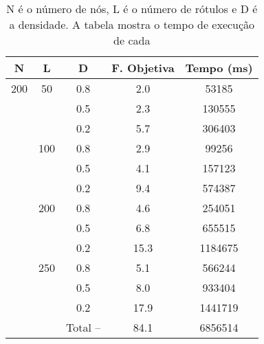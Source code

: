 \documentclass{sig-alternate-05-2015}
\begin{document}
\begin{table}[!h]


\begin{tabular}{ccccc}
	\hline \rule[-2ex]{0pt}{5.5ex} N & L & D  & F. Objetiva & Tempo (ms) \\ 
	\hline \rule[-2ex]{0pt}{5.5ex} 200 & 50 & 0.8 & 2.0 & 53185 \\ 
	\rule[-2ex]{0pt}{5.5ex}  &  & 0.5 & 2.3 & 130555 \\ 
	 \rule[-2ex]{0pt}{5.5ex}  &  & 0.2 & 5.7 & 306403 \\ 
	 \rule[-2ex]{0pt}{5.5ex}  & 100 & 0.8 & 2.9 & 99256 \\ 
	 \rule[-2ex]{0pt}{5.5ex}  &  & 0.5 & 4.1 & 157123 \\ 
	 \rule[-2ex]{0pt}{5.5ex}  &  & 0.2 & 9.4 & 574387 \\ 
	 \rule[-2ex]{0pt}{5.5ex}  & 200 & 0.8 & 4.6 & 254051 \\ 
	 \rule[-2ex]{0pt}{5.5ex}  &  & 0.5 & 6.8 & 655515 \\ 
	 \rule[-2ex]{0pt}{5.5ex}  &  & 0.2 & 15.3 & 1184675 \\ 
	 \rule[-2ex]{0pt}{5.5ex}  & 250 & 0.8 & 5.1 & 566244 \\ 
	 \rule[-2ex]{0pt}{5.5ex}  &  & 0.5 & 8.0 & 933404 \\ 
	 \rule[-2ex]{0pt}{5.5ex}  &  & 0.2 & 17.9 & 1441719 \\ 
	\hline \rule[-2ex]{0pt}{5.5ex}  &  & Total --  & 84.1 & 6856514 \\ 
	\hline 
\end{tabular} 
\caption{N é o número de nós, L é o número de rótulos e D é a densidade.  A tabela mostra o tempo de execução de cada}
\label{tab3}
\end{table}
\end{document}
